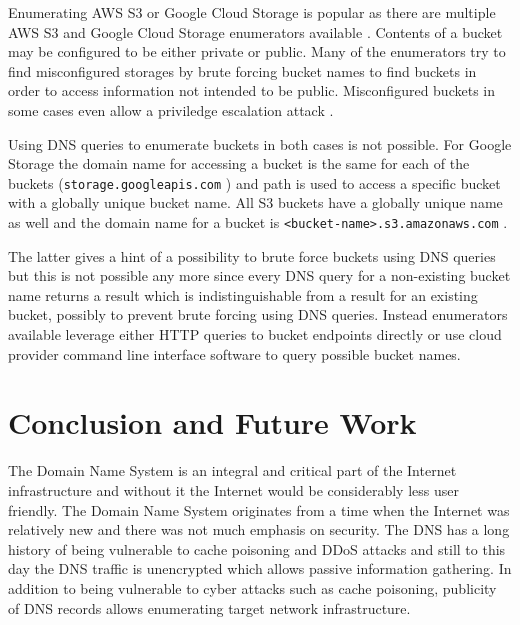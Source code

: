Enumerating AWS S3 or Google Cloud Storage is popular as there are multiple AWS S3 and Google Cloud Storage enumerators available \cite{GCPBucket}\citep{AWSpentest}. Contents of a bucket may be configured to be either private or public. Many of the enumerators try to find misconfigured storages by brute forcing bucket names to find buckets in order to access information not intended to be public. Misconfigured buckets in some cases even allow a priviledge escalation attack \cite{GCPBucket}.

Using DNS queries to enumerate buckets in both cases is not possible. For Google Storage the domain name for accessing a bucket is the same for each of the buckets (\texttt{storage.googleapis.com} \cite{googlebuckets}) and path is used to access a specific bucket with a globally unique bucket name. All S3 buckets have a globally unique name as well and the domain name for a bucket is \texttt{<bucket-name>.s3.amazonaws.com} \cite{s3buckets}.

The latter gives a hint of a possibility to brute force buckets using DNS queries but this is not possible any more \cite{S3enum} since every DNS query for a non-existing bucket name returns a result which is indistinguishable  from a result for an existing bucket, possibly to prevent brute forcing using DNS queries. Instead enumerators available leverage either HTTP queries to bucket endpoints directly or use cloud provider command line interface software to query possible bucket names.

\section{Conclusion and Future Work}

The Domain Name System is an integral and critical part of the Internet infrastructure and without it the Internet would be considerably less user friendly. The Domain Name System originates from a time when the Internet was relatively new and there was not much emphasis on security. The DNS has a long history of being vulnerable to cache poisoning and DDoS attacks and still to this day the DNS traffic is unencrypted which allows passive information gathering. In addition to being vulnerable to cyber attacks such as cache poisoning, publicity of DNS records allows enumerating target network infrastructure.

